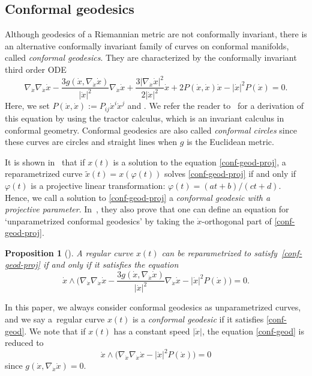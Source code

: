 \documentclass[pdftex]{sigma}
\numberwithin{equation}{section}
\newtheorem{Proposition}[Theorem]{Proposition}
 { \theoremstyle{definition}
\newtheorem{Definition}[Theorem]{Definition}
\newtheorem*{Notation}{Notation}
\newtheorem{Example}[Theorem]{Example}
\newtheorem{Remark}[Theorem]{Remark} }
\begin{document}
\subsection{Conformal geodesics}
Although geodesics of a Riemannian metric are not conformally invariant, there is an alternative conformally invariant family of curves on conformal manifolds, called {\it conformal geodesics}. They are characterized by the conformally invariant third order ODE
\begin{equation}\label{conf-geod-proj}
\nabla_{\dot x}\nabla_{\dot x}\dot x-\frac{3g(\dot x, \nabla_{\dot x}\dot x)}{|\dot x|^2}\nabla_{\dot x}\dot x+\frac{3|\nabla_{\dot x}\dot x|^2}{2|\dot x|^2}\dot x
+2P(\dot x, \dot x)\dot x-|\dot x|^2P(\dot x)=0.
\end{equation}
Here, we set $P(\dot x, \dot x):=P_{ij}\dot x^i\dot x^j$ and . We refer the reader to~\cite{BEG} for a derivation of this equation by using the tractor calculus, which is an invariant calculus in conformal geometry.
Conformal geodesics are also called {\it conformal circles} since these curves are circles and straight lines when $g$ is the Euclidean metric.

It is shown in~\cite{BE} that if $x(t)$ is a solution to the equation \eqref{conf-geod-proj}, a reparametrized curve $\tilde x(t)=x(\varphi(t))$ solves \eqref{conf-geod-proj} if and only if $\varphi(t)$ is a projective linear transformation: $\varphi(t)=(at+b)/(ct+d)$. Hence, we call a solution to \eqref{conf-geod-proj}
a {\it conformal geodesic with a projective parameter}. In~\cite{BE}, they also prove that one can define an equation for `unparametrized conformal geodesics' by taking the $\dot x$-orthogonal part of \eqref{conf-geod-proj}.
\begin{Proposition}[{\cite[Proposition 4.2]{BE}}]
A regular curve $x(t)$ can be reparametrized to satisfy~\eqref{conf-geod-proj} if and only if it satisfies the equation
\begin{equation}\label{conf-geod}
\dot x\wedge\biggl(\nabla_{\dot x}\nabla_{\dot x}\dot x-\frac{3g(\dot x, \nabla_{\dot x}\dot x)}{|\dot x|^2}\nabla_{\dot x}\dot x-|\dot x|^2P(\dot x)\biggr)=0.
\end{equation}
\end{Proposition}
In this paper, we always consider conformal geodesics as unparametrized curves, and we say a~regular curve $x(t)$ is a {\it conformal geodesic} if it satisfies \eqref{conf-geod}.
We note that if $x(t)$ has a constant speed $|\dot x|$, the equation \eqref{conf-geod} is reduced to
\begin{equation}\label{conf-geod-const-speed}
\dot x\wedge\bigl(\nabla_{\dot x}\nabla_{\dot x}\dot x-|\dot x|^2P(\dot x)\bigr)=0
\end{equation}
since $g(\dot x, \nabla_{\dot x}\dot x)=0$.
\end{document}
